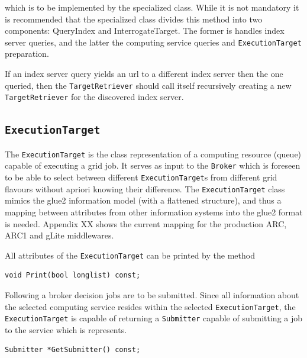 \documentclass{book}
\newcommand{\TargetRetriever}{\texttt{TargetRetriever}}
\newcommand{\ExecutionTarget}{\texttt{ExecutionTarget}}
\newcommand{\Broker}{\texttt{Broker}}
\newcommand{\Submitter}{\texttt{Submitter}}
\begin{document}
which is to be implemented by the specialized class. While it is not mandatory it is recommended that the specialized class 
divides this method into two components: QueryIndex and InterrogateTarget. The former is handles index server queries, and the 
latter the computing service queries and {\ExecutionTarget} preparation. 

If an index server query yields an url to a different index server then the one queried, then the {\TargetRetriever} should 
call itself recursively creating a new {\TargetRetriever} for the discovered index server. 

\subsection{{\ExecutionTarget}} The {\ExecutionTarget} is the class representation of a computing resource (queue) capable of 
executing a grid job. It serves as input to the {\Broker} which is foreseen to be able to select between different 
{\ExecutionTarget}s from different grid flavours without apriori knowing their difference. The {\ExecutionTarget} class 
mimics the glue2 information model (with a flattened structure), and thus a mapping between attributes from other information 
systems into the glue2 format is needed.  Appendix XX shows the current mapping for the production ARC, ARC1 and gLite middlewares. 

All attributes of the {\ExecutionTarget} can be printed by the method

\begin{shaded}
\begin{verbatim}                                                                                                                            
void Print(bool longlist) const;
\end{verbatim}
\end{shaded}

Following a broker decision jobs are to be submitted. Since all information about the selected computing service resides within the 
selected {\ExecutionTarget}, the {\ExecutionTarget} is capable of returning a {\Submitter} capable of submitting a 
job to the service which is represents.

\begin{shaded}
\begin{verbatim}
Submitter *GetSubmitter() const;
\end{verbatim}
\end{shaded}
\end{document}
